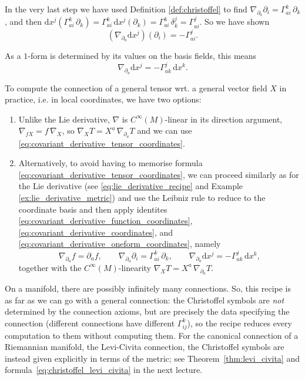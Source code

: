 In the very last step we have used Definition \ref{def:christoffel} to find $\nabla_{\partial_a}\partial_i = \Gamma^k_{ai}\,\partial_k$, and then $\mathrm{d}x^j(\Gamma^k_{ai}\,\partial_k) = \Gamma^k_{ai}\,\mathrm{d}x^j(\partial_k) = \Gamma^k_{ai}\,\delta^j_k = \Gamma^j_{ai}$. So we have shown
\[
(\nabla_{\partial_a}\mathrm{d}x^j)(\partial_i) = -\Gamma^j_{ai}.
\]

As a $1$-form is determined by its values on the basis fields, this means
\begin{equation}
    \label{eq:covariant_derivative_oneform_coordinates}
    \nabla_{\partial_a}\mathrm{d}x^j = -\Gamma^j_{ak}\,\mathrm{d}x^k.
\end{equation}






To compute the connection of a general tensor wrt. a general vector field $X$ in practice, i.e. in local coordinates, we have two options:
\begin{enumerate}[itemsep=0pt, topsep=0pt]
    \item 
    Unlike the Lie derivative, $\nabla$ is $C^\infty(M)$-linear in its direction argument, $\nabla_{fX} = f\,\nabla_X$, so $\nabla_X T = X^a\,\nabla_{\partial_a} T$ and we can use \eqref{eq:covariant_derivative_tensor_coordinates}.
    \item 
    Alternatively, to avoid having to memorise formula \eqref{eq:covariant_derivative_tensor_coordinates}, we can proceed similarly as for the Lie derivative (see \eqref{eq:lie_derivative_recipe} and Example \ref{ex:lie_derivative_metric}) and use the Leibniz rule to reduce to the coordinate basis and then apply identites \eqref{eq:covariant_derivative_function_coordinates}, \eqref{eq:covariant_derivative_coordinates}, and \eqref{eq:covariant_derivative_oneform_coordinates}, namely
    \begin{equation}
        \label{eq:connection_recipe}
        \nabla_{\partial_a} f = \partial_a f, \qquad
        \nabla_{\partial_a}\partial_i = \Gamma^k_{ai}\,\partial_k, \qquad
        \nabla_{\partial_a}\mathrm{d}x^j = -\Gamma^j_{ak}\,\mathrm{d}x^k,
    \end{equation}
    together with the $C^\infty(M)$-linearity $\nabla_X T = X^a\,\nabla_{\partial_a} T$. \\
\end{enumerate}

On a manifold, there are possibly infinitely many connections. So, this recipe is as far as we can go with a general connection: the Christoffel symbols are \emph{not} determined by the connection axioms, but are precisely the data specifying the connection (different connections have different $\Gamma^k_{ij}$), so the recipe reduces every computation to them without computing them. For the canonical connection of a Riemannian manifold, the Levi-Civita connection, the Christoffel symbols are instead given explicitly in terms of the metric; see Theorem~\ref{thm:levi_civita} and formula~\eqref{eq:christoffel_levi_civita} in the next lecture.\\



